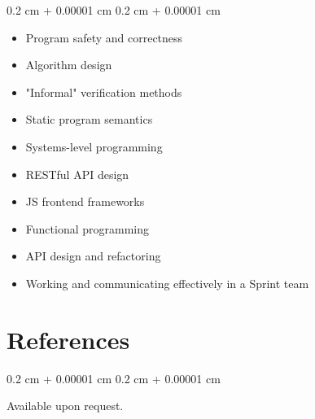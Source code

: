 \documentclass[10pt, a4paper]{article}
\newenvironment{highlightsforbulletentries}{
    \begin{itemize}[
        topsep=0.10 cm,
        parsep=0.10 cm,
        partopsep=0pt,
        itemsep=0pt,
        leftmargin=10pt
    ]
}{
    \end{itemize}
} %
\newenvironment{onecolentry}{
    \begin{adjustwidth}{
        0.2 cm + 0.00001 cm
    }{
        0.2 cm + 0.00001 cm
    }
}{
    \end{adjustwidth}
} %
\begin{document}
    \begin{onecolentry}
        \begin{highlightsforbulletentries}


        \item Program safety and correctness

        \item Algorithm design

        \item "Informal" verification methods

        \item Static program semantics

        \item Systems-level programming

        \item RESTful API design

        \item JS frontend frameworks

        \item Functional programming

        \item API design and refactoring

        \item Working and communicating effectively in a Sprint team


        \end{highlightsforbulletentries}
    \end{onecolentry}

    \section{References}



        
        \begin{onecolentry}
            Available upon request.
        \end{onecolentry}


    
\end{document}
